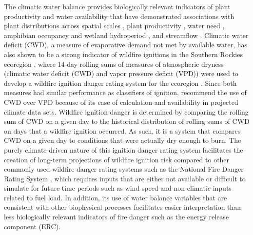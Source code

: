 \documentclass[11p]{article}
\begin{document}
The climatic water balance provides biologically relevant indicators of plant productivity and water availability that have demonstrated associations with plant distributions across spatial scales \citep{stephensonActualEvapotranspirationDeficit1998,stephensonClimaticControlVegetation1990}, plant productivity \citep{thomaSemiaridVegetationResponse2016,thomaWaterBalanceIndicator2020}, water need \citep{thomaLandscapePivotPoints2019}, amphibian occupancy and wetland hydroperiod \citep{rayMultispeciesAmphibianMonitoring2022,lafranceAmphibianRichnessRarity2024}, and streamflow \citep{thomaWaterBalanceIndicator2020}. Climatic water deficit (CWD), a measure of evaporative demand not met by available water, has also shown to be a strong indicator of wildfire ignitions in the Southern Rockies ecoregion \citep{omernikEcoregionsConterminousUnited1987}, where 14-day rolling sums of measures of atmospheric dryness (climatic water deficit (CWD) and vapor pressure deficit (VPD)) were used to develop a wildfire ignition danger rating system for the ecoregion \citep{thomaWaterBalanceIndicator2020}. Since both measures had similar performance as classifiers of ignition, \citet{thomaWaterBalanceIndicator2020} recommend the use of CWD over VPD because of its ease of calculation and availability in projected climate data sets. Wildfire ignition danger is determined by comparing the rolling sum of CWD on a given day to the historical distribution of rolling sums of CWD on days that a wildfire ignition occurred. As such, it is a system that compares CWD on a given day to conditions that were actually dry enough to burn. The purely climate-driven nature of this ignition danger rating system facilitates the creation of long-term projections of wildfire ignition risk compared to other commonly used wildfire danger rating systems such as the National Fire Danger Rating System \citep{degrootChapter11Wildland2015}, which requires inputs that are either not available or difficult to simulate for future time periods such as wind speed and non-climatic inputs related to fuel load. In addition, its use of water balance variables that are consistent with other biophysical processes facilitates easier interpretation than less biologically relevant indicators of fire danger such as the energy release component (ERC).
\end{document}
